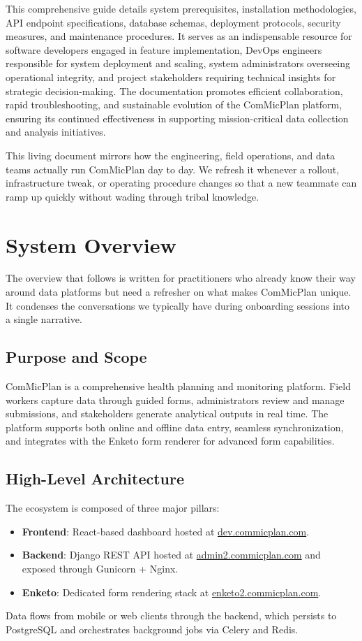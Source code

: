 \documentclass[11pt]{article}
\begin{document}
This comprehensive guide details system prerequisites, installation methodologies, API endpoint specifications, database schemas, deployment protocols, security measures, and maintenance procedures. It serves as an indispensable resource for software developers engaged in feature implementation, DevOps engineers responsible for system deployment and scaling, system administrators overseeing operational integrity, and project stakeholders requiring technical insights for strategic decision-making. The documentation promotes efficient collaboration, rapid troubleshooting, and sustainable evolution of the ComMicPlan platform, ensuring its continued effectiveness in supporting mission-critical data collection and analysis initiatives.

\clearpage
\pagestyle{plain}
\tableofcontents
\clearpage

This living document mirrors how the engineering, field operations, and data teams actually run ComMicPlan day to day. We refresh it whenever a rollout, infrastructure tweak, or operating procedure changes so that a new teammate can ramp up quickly without wading through tribal knowledge.

\section{System Overview}
\noindent The overview that follows is written for practitioners who already know their way around data platforms but need a refresher on what makes ComMicPlan unique. It condenses the conversations we typically have during onboarding sessions into a single narrative.
\subsection{Purpose and Scope}
ComMicPlan is a comprehensive health planning and monitoring platform. Field workers capture data through guided forms, administrators review and manage submissions, and stakeholders generate analytical outputs in real time. The platform supports both online and offline data entry, seamless synchronization, and integrates with the Enketo form renderer for advanced form capabilities.

\subsection{High-Level Architecture}
The ecosystem is composed of three major pillars:
\begin{itemize}[leftmargin=*]
  \item \textbf{Frontend}: React-based dashboard hosted at \href{https://dev.commicplan.com}{dev.commicplan.com}.
  \item \textbf{Backend}: Django REST API hosted at \href{https://admin2.commicplan.com}{admin2.commicplan.com} and exposed through Gunicorn + Nginx.
  \item \textbf{Enketo}: Dedicated form rendering stack at \href{https://enketo2.commicplan.com}{enketo2.commicplan.com}.
\end{itemize}
Data flows from mobile or web clients through the backend, which persists to PostgreSQL and orchestrates background jobs via Celery and Redis.
\end{document}
